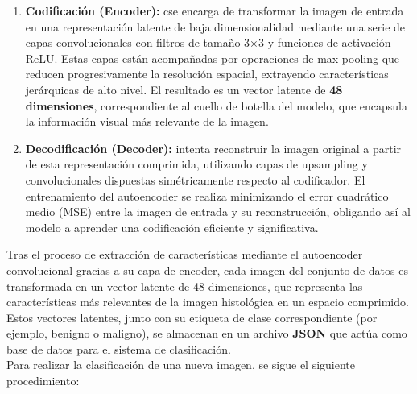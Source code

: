 \documentclass[12pt]{article} %
\begin{document}
\begin{enumerate}
    \item \textbf{Codificación (Encoder):} cse encarga de transformar la imagen de entrada en una representación latente de baja dimensionalidad mediante una serie de capas convolucionales con filtros de tamaño 3×3 y funciones de activación ReLU. Estas capas están acompañadas por operaciones de max pooling que reducen progresivamente la resolución espacial, extrayendo características jerárquicas de alto nivel. El resultado es un vector latente de \textbf{48 dimensiones}, correspondiente al cuello de botella del modelo, que encapsula la información visual más relevante de la imagen.
    \item \textbf{Decodificación (Decoder):} intenta reconstruir la imagen original a partir de esta representación comprimida, utilizando capas de upsampling y convolucionales dispuestas simétricamente respecto al codificador. El entrenamiento del autoencoder se realiza minimizando el error cuadrático medio (MSE) entre la imagen de entrada y su reconstrucción, obligando así al modelo a aprender una codificación eficiente y significativa.
\end{enumerate}

Tras el proceso de extracción de características mediante el autoencoder convolucional gracias a su capa de encoder, cada imagen del conjunto de datos es transformada en un vector latente de 48 dimensiones, que representa las características más relevantes de la imagen histológica en un espacio comprimido. Estos vectores latentes, junto con su etiqueta de clase correspondiente (por ejemplo, benigno o maligno), se almacenan en un archivo \textbf{JSON} que actúa como base de datos para el sistema de clasificación.\\

Para realizar la clasificación de una nueva imagen, se sigue el siguiente procedimiento:
\end{document}
